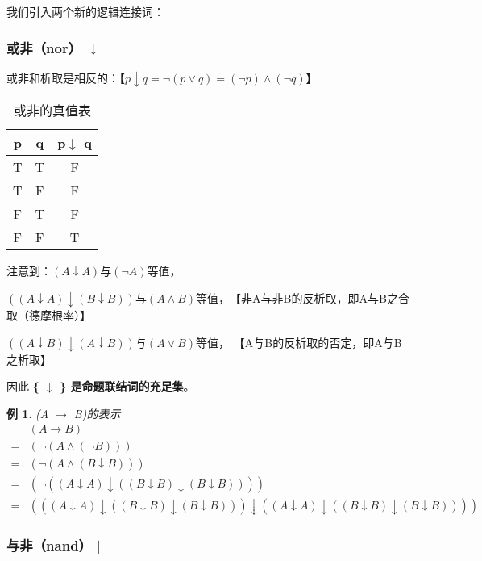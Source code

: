 \documentclass[12pt,onecolumn,a4paper]{book}
\newtheorem*{example}{例}
\numberwithin{table}{subsection}
\numberwithin{equation}{subsection}
\begin{document}
我们引入两个新的逻辑连接词：

\subsubsection{或非（nor） $\downarrow$ }

或非和析取是相反的：【$p\downarrow q = \neg(p\vee q)= (\neg p)\wedge (\neg q)$】

\begin{table}[h]
    \centering
    \setlength{\tabcolsep}{5mm}
    \begin{tabular}{c c c}
        \toprule
        p & q & p$\downarrow$ q \\
        \midrule
        T & T & F \\
        T & F & F \\
        F & T & F \\
        F & F & T \\
        \bottomrule
      \end{tabular}
    \caption{或非的真值表}
\end{table}

注意到：$(A\downarrow A) \text{与} (\neg A) \text{等值，} $

$((A\downarrow A)\downarrow (B\downarrow B)) \text{与} (A\wedge B) \text{等值，} $【非A与非B的反析取，即A与B之合取（德摩根率）】

$((A\downarrow B)\downarrow (A\downarrow B)) \text{与} (A\vee B) \text{等值，}$ 【A与B的反析取的否定，即A与B之析取】

因此\textbf{ \{ $\downarrow$ \} 是命题联结词的充足集}。

\begin{example}
    (A $\to$ B)的表示
    \begin{align*}
        &(A \to B) \\
        =&(\neg (A\wedge (\neg B))) \\
        =&(\neg (A\wedge (B\downarrow B))) \\
        =&(\neg ((A\downarrow A)\downarrow ((B\downarrow B)\downarrow (B\downarrow B)))) \\
        =&(((A\downarrow A)\downarrow ((B\downarrow B)\downarrow (B\downarrow B)))\downarrow ((A\downarrow A)\downarrow ((B\downarrow B)\downarrow (B\downarrow B)))) 
    \end{align*}
\end{example}

\subsubsection{与非（nand） $|$ }
\end{document}
